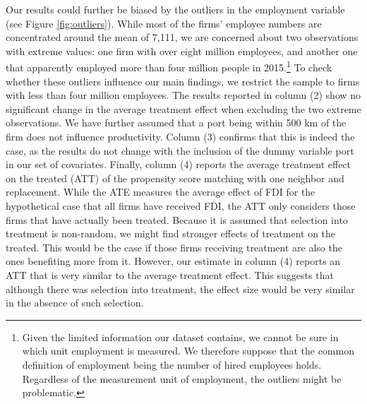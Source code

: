 \documentclass[a4paper,11pt]{scrartcl}
\begin{document}
Our results could further be biased by the outliers in the employment variable (see Figure \ref{fig:outliers}). While most of the firms' employee numbers are concentrated around the mean of 7,111, we are concerned about two observations with extreme values: one firm with over eight million employees, and another one that apparently employed more than four million people in 2015.\footnote{Given the limited information our dataset contains, we cannot be sure in which unit employment is measured. We therefore suppose that the common definition of employment being the number of hired employees holds. Regardless of the measurement unit of employment, the outliers might be problematic.}  To check whether these outliers influence our main findings, we restrict the sample to firms with less than four million employees. The results reported in column (2) show no significant change in the average treatment effect when excluding the two extreme observations. %
We have further assumed that a port being within 500 km of the firm does not influence productivity. Column (3) confirms that this is indeed the case, as the results do not change with the inclusion of the dummy variable port in our set of covariates. 
Finally, column (4) reports the average treatment effect on the treated (ATT) of the propensity score matching with one neighbor and replacement. While the ATE measures the average effect of FDI for the hypothetical case that all firms have received FDI, the ATT only considers those firms that have actually been treated. Because it is assumed that selection into treatment is non-random, we might find stronger effects of treatment on the treated. This would be the case if those firms receiving treatment are also the ones benefiting more from it. However, our estimate in column (4) reports an ATT that is very similar to the average treatment effect. This suggests that although there was selection into treatment, the effect size would be very similar in the absence of such selection. 
\end{document}
